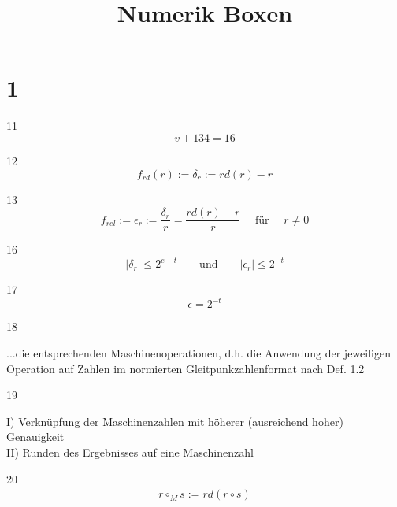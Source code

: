 \documentclass[13pt]{scrreprt}
\title{Numerik Boxen}
\author{}
\newenvironment{ebox}[1]{#1\\}{}
\begin{document}
\maketitle

\begin{abstract}
\end{abstract}


\chapter{1}

11
\begin{equation*}
v + 134 = 16
\end{equation*}
	
12
\begin{equation*}
f_{rd}(r):= \delta_{r}:=rd(r)-r
\end{equation*}

13
\begin{equation*}
f_{rel}:=\epsilon_{r}:= \frac{\delta_{r}}{r}=\frac{rd(r) -r}{r} \quad\text{ für }\quad r \ne 0
\end{equation*}



16
\begin{equation*}
|\delta_{r}| \leqslant 2^{e-t} \qquad \text{und} \qquad  |\epsilon_{r}| \leqslant 2^{-t}
\end{equation*}

17
\begin{equation*}
\epsilon = 2^{-t}
\end{equation*}

18

...die entsprechenden Maschinenoperationen, d.h. die Anwendung der jeweiligen Operation auf Zahlen im normierten Gleitpunkzahlenformat nach Def. 1.2

19

I) Verknüpfung der Maschinenzahlen mit höherer (ausreichend hoher) Genauigkeit\\
II) Runden des Ergebnisses auf eine Maschinenzahl

\begin{ebox}{20}
	\begin{align*}
	r \circ _{M}s := rd(r \circ s)
	\end{align*}
\end{ebox}
\end{document}

